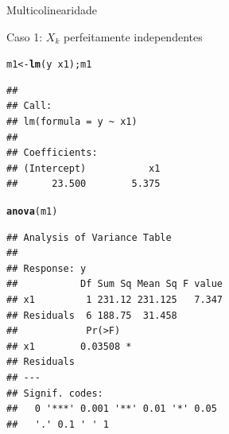 \documentclass{beamer}\usepackage[]{graphicx}\usepackage[]{color}
\makeatletter
\newcommand{\hlopt}[1]{\textcolor[rgb]{0,0,0}{#1}}%
\newcommand{\hlstd}[1]{\textcolor[rgb]{0.345,0.345,0.345}{#1}}%
\newcommand{\hlkwb}[1]{\textcolor[rgb]{0.69,0.353,0.396}{#1}}%
\newcommand{\hlkwd}[1]{\textcolor[rgb]{0.737,0.353,0.396}{\textbf{#1}}}%
\newenvironment{kframe}{%
 \def\at@end@of@kframe{}%
 \ifinner\ifhmode%
  \def\at@end@of@kframe{\end{minipage}}%
  \begin{minipage}{\columnwidth}%
 \fi\fi%
 \def\FrameCommand##1{\hskip\@totalleftmargin \hskip-\fboxsep
 \colorbox{shadecolor}{##1}\hskip-\fboxsep
     \hskip-\linewidth \hskip-\@totalleftmargin \hskip\columnwidth}%
 \MakeFramed {\advance\hsize-\width
   \@totalleftmargin\z@ \linewidth\hsize
   \@setminipage}}%
 {\par\unskip\endMakeFramed%
 \at@end@of@kframe}
\newenvironment{knitrout}{}{} %
\renewenvironment{knitrout}{\setlength{\topsep}{0mm}}{}
\makeatother
\begin{document}
\begin{frame}[fragile]{Multicolinearidade}

Caso 1: $X_k$ perfeitamente independentes
\vfill

\begin{knitrout}\tiny
{}\color{fgcolor}\begin{kframe}
\begin{alltt}
\hlstd{m1} \hlkwb{<-} \hlkwd{lm}\hlstd{(y} \hlopt{~} \hlstd{x1);m1}
\end{alltt}
\begin{verbatim}
## 
## Call:
## lm(formula = y ~ x1)
## 
## Coefficients:
## (Intercept)           x1  
##      23.500        5.375
\end{verbatim}
\begin{alltt}
\hlkwd{anova}\hlstd{(m1)}
\end{alltt}
\begin{verbatim}
## Analysis of Variance Table
## 
## Response: y
##           Df Sum Sq Mean Sq F value
## x1         1 231.12 231.125   7.347
## Residuals  6 188.75  31.458        
##            Pr(>F)  
## x1        0.03508 *
## Residuals          
## ---
## Signif. codes:  
##   0 '***' 0.001 '**' 0.01 '*' 0.05
##   '.' 0.1 ' ' 1
\end{verbatim}
\end{kframe}
\end{knitrout}

\end{frame}
\end{document}
